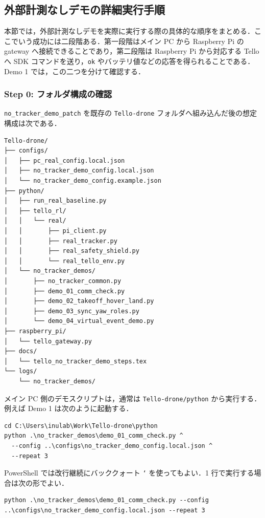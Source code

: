 \subsection{外部計測なしデモの詳細実行手順}
\label{subsec:no_tracker_demo_detailed_steps}

本節では，外部計測なしデモを実際に実行する際の具体的な順序をまとめる．ここでいう成功には二段階ある．第一段階はメイン PC から Raspberry Pi の gateway へ接続できることであり，第二段階は Raspberry Pi から対応する Tello へ SDK コマンドを送り，\texttt{ok} やバッテリ値などの応答を得られることである．Demo 1 では，この二つを分けて確認する．

\subsubsection{Step 0: フォルダ構成の確認}

\texttt{no\_tracker\_demo\_patch} を既存の \texttt{Tello-drone} フォルダへ組み込んだ後の想定構成は次である．

\begin{lstlisting}
Tello-drone/
├── configs/
│   ├── pc_real_config.local.json
│   ├── no_tracker_demo_config.local.json
│   └── no_tracker_demo_config.example.json
├── python/
│   ├── run_real_baseline.py
│   ├── tello_rl/
│   │   └── real/
│   │       ├── pi_client.py
│   │       ├── real_tracker.py
│   │       ├── real_safety_shield.py
│   │       └── real_tello_env.py
│   └── no_tracker_demos/
│       ├── no_tracker_common.py
│       ├── demo_01_comm_check.py
│       ├── demo_02_takeoff_hover_land.py
│       ├── demo_03_sync_yaw_roles.py
│       └── demo_04_virtual_event_demo.py
├── raspberry_pi/
│   └── tello_gateway.py
├── docs/
│   └── tello_no_tracker_demo_steps.tex
└── logs/
    └── no_tracker_demos/
\end{lstlisting}

メイン PC 側のデモスクリプトは，通常は \texttt{Tello-drone/python} から実行する．例えば Demo 1 は次のように起動する．

\begin{lstlisting}
cd C:\Users\inulab\Work\Tello-drone\python
python .\no_tracker_demos\demo_01_comm_check.py ^
  --config ..\configs\no_tracker_demo_config.local.json ^
  --repeat 3
\end{lstlisting}

PowerShell では改行継続にバッククォート \texttt{`} を使ってもよい．1 行で実行する場合は次の形でよい．

\begin{lstlisting}
python .\no_tracker_demos\demo_01_comm_check.py --config ..\configs\no_tracker_demo_config.local.json --repeat 3
\end{lstlisting}

